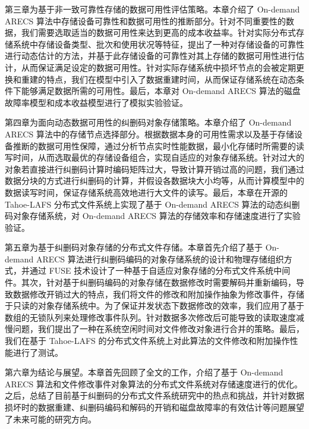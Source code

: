 第三章为基于非一致可靠性存储的数据可用性评估策略。本章介绍了 On-demand ARECS 算法中存储设备可靠性和数据可用性的推断部分。针对不同重要性的数据，我们需要选取适当的数据可用性来达到更高的成本收益率。针对实际分布式存储系统中存储设备类型、批次和使用状况等特征，提出了一种对存储设备的可靠性进行动态估计的方法，并基于此存储设备的可靠性对其上存储的数据可用性进行估计，从而保证满足设定的数据可用性。针对实际存储系统中损坏节点的会被定期更换和重建的特点，我们在模型中引入了数据重建时间，从而保证存储系统在动态条件下能够满足数据所需的可用性。最后，本章对 On-demand ARECS 算法的磁盘故障率模型和成本收益模型进行了模拟实验验证。

第四章为面向动态数据可用性的纠删码对象存储策略。本章介绍了 On-demand ARECS 算法中的存储节点选择部分。根据数据本身的可用性需求以及基于存储设备推断的数据可用性保障，通过分析节点实时性能数据，最小化存储时所需要的读写时间，从而选取最优的存储设备组合，实现自适应的对象存储系统。针对过大的对象若直接进行纠删码计算时编码矩阵过大，导致计算开销过高的问题，我们通过数据分块的方式进行纠删码的计算，并假设各数据块大小均等，从而计算模型中的数据读写时间，保证存储系统高效地进行大文件的读写。最后，本章在开源的 Tahoe-LAFS 分布式文件系统上实现了基于 On-demand ARECS 算法的动态纠删码对象存储系统，对 On-demand ARECS 算法的存储效率和存储速度进行了实验验证。

第五章为基于纠删码对象存储的分布式文件存储。本章首先介绍了基于 On-demand ARECS 算法进行纠删码编码的对象存储系统的设计和物理存储组织方式，并通过 FUSE 技术设计了一种基于自适应对象存储的分布式文件系统中间件。其次，针对基于纠删码编码的对象存储在数据修改时需要解码并重新编码，导致数据修改开销过大的特点，我们将文件的修改和附加操作抽象为修改事件，存储于只读的对象存储系统中。为了保证并发状态下数据修改的效率，我们应用了基于数组的无锁队列来处理修改事件队列。针对数据多次修改后可能导致的读取速度减慢问题，我们提出了一种在系统空闲时间对文件修改对象进行合并的策略。最后，我们在基于 Tahoe-LAFS 的分布式文件系统上对此算法的文件修改和附加操作性能进行了测试。

第六章为结论与展望。本章首先回顾了全文的工作，介绍了基于 On-demand ARECS 算法和文件修改事件对象算法的分布式文件系统对存储速度进行的优化。之后，总结了目前基于纠删码的分布式文件系统研究中的热点和挑战，并针对数据损坏时的数据重建、纠删码编码和解码的开销和磁盘故障率的有效估计等问题展望了未来可能的研究方向。
